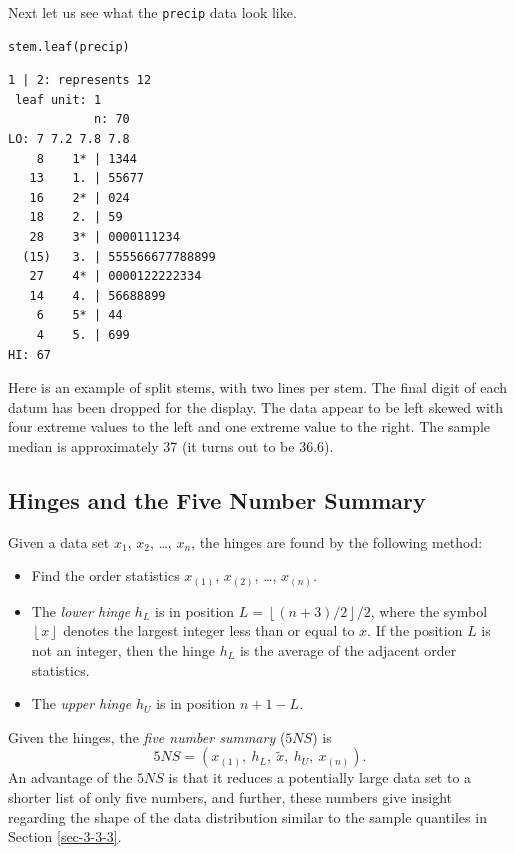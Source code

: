 \documentclass[captions=tableheading]{scrbook}
\begin{document}
Next let us see what the \texttt{precip} data look like.


\begin{verbatim}
stem.leaf(precip)
\end{verbatim}


\begin{verbatim}
1 | 2: represents 12
 leaf unit: 1
            n: 70
LO: 7 7.2 7.8 7.8
    8    1* | 1344
   13    1. | 55677
   16    2* | 024
   18    2. | 59
   28    3* | 0000111234
  (15)   3. | 555566677788899
   27    4* | 0000122222334
   14    4. | 56688899
    6    5* | 44
    4    5. | 699
HI: 67
\end{verbatim}

Here is an example of split stems, with two lines per stem. The final digit of each datum has been dropped for the display. The data appear to be left skewed with four extreme values to the left and one extreme value to the right. The sample median is approximately 37 (it turns out to be 36.6).
\subsection{Hinges and the Five Number Summary}
\label{sec-3-4-2}
\label{sub-hinges-and-5NS}


Given a data set \(x_{1}\), \(x_{2}\), \ldots{}, \(x_{n}\), the hinges are found by the following method:  
\begin{itemize}
\item Find the order statistics \(x_{(1)}\), \(x_{(2)}\), \ldots{}, \(x_{(n)}\).
\item The \emph{lower hinge} \(h_{L}\) is in position \(L=\left\lfloor (n+3)/2\right\rfloor / 2\), where the symbol \( \left\lfloor x\right\rfloor \) denotes the largest integer less than or equal to \(x\). If the position \(L\) is not an integer, then the hinge \(h_{L}\) is the average of the adjacent order statistics.
\item The \emph{upper hinge} \(h_{U}\) is in position \(n+1-L\).
\end{itemize}
Given the hinges, the \emph{five number summary} (\(5NS\)) is 
\begin{equation} 
5NS=(x_{(1)},\ h_{L},\ \tilde{x},\ h_{U},\ x_{(n)}).
\end{equation}
An advantage of the \(5NS\) is that it reduces a potentially large data set to a shorter list of only five numbers, and further, these numbers give insight regarding the shape of the data distribution similar to the sample quantiles in Section \ref{sec-3-3-3}.
\end{document}

